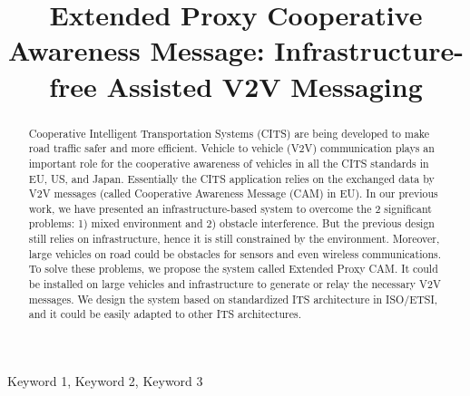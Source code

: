 \documentclass[conference,twocolumn]{IEEEtran}
\begin{document}
\title{Extended Proxy Cooperative Awareness Message: Infrastructure-free Assisted V2V Messaging}
\author{
}

\maketitle

\begin{abstract}
Cooperative Intelligent Transportation Systems
(CITS) are being developed to make road traffic safer and more efficient.
Vehicle to vehicle (V2V) communication plays an important role for the cooperative
awareness of vehicles in all the CITS standards in EU, US, and Japan.
Essentially the CITS application relies on the exchanged data by V2V messages (called Cooperative Awareness Message (CAM) in EU).
In our previous work, we have presented an infrastructure-based system to overcome the 2 significant problems:
1) mixed environment and 2) obstacle interference.
But the previous design still relies on infrastructure, hence it is still constrained by the environment.
Moreover, large vehicles on road could be obstacles for sensors and even wireless communications.
To solve these problems, we propose the system called Extended Proxy CAM.
It could be installed on large vehicles and infrastructure to generate or relay the necessary V2V messages.
We design the system based on standardized ITS architecture in ISO/ETSI, and it could be easily adapted to other ITS architectures.
\end{abstract}

\begin{IEEEkeywords}
 Keyword 1, Keyword 2, Keyword 3
\end{IEEEkeywords}









\end{document}
